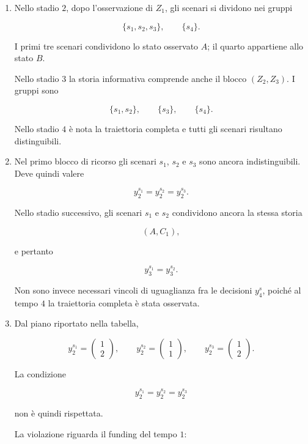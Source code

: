 \begin{enumerate}

\item Nello stadio $2$,
dopo l'osservazione di $Z_1$,
gli scenari si dividono nei gruppi

\[
\{s_1,s_2,s_3\},
\qquad
\{s_4\}.
\]

I primi tre scenari condividono
lo stato osservato $A$;
il quarto appartiene allo stato $B$.

Nello stadio $3$ la storia informativa
comprende anche il blocco $(Z_2,Z_3)$.
I gruppi sono

\[
\{s_1,s_2\},
\qquad
\{s_3\},
\qquad
\{s_4\}.
\]

Nello stadio $4$ \`e nota
la traiettoria completa e tutti
gli scenari risultano distinguibili.

\item Nel primo blocco di ricorso
gli scenari $s_1$, $s_2$ e $s_3$
sono ancora indistinguibili.
Deve quindi valere

\[
\boxed{
y_2^{s_1}
=
y_2^{s_2}
=
y_2^{s_3}.
}
\]

Nello stadio successivo,
gli scenari $s_1$ e $s_2$
condividono ancora la stessa storia

\[
(A,C_1),
\]

e pertanto

\[
\boxed{
y_3^{s_1}=y_3^{s_2}.
}
\]

Non sono invece necessari
vincoli di uguaglianza fra
le decisioni $y_4^s$,
poich\'{e} al tempo $4$
la traiettoria completa
\`e stata osservata.

\item Dal piano riportato nella tabella,

\[
y_2^{s_1}
=
\begin{pmatrix}
1\\
2
\end{pmatrix},
\qquad
y_2^{s_2}
=
\begin{pmatrix}
1\\
1
\end{pmatrix},
\qquad
y_2^{s_3}
=
\begin{pmatrix}
1\\
2
\end{pmatrix}.
\]

La condizione

\[
y_2^{s_1}
=
y_2^{s_2}
=
y_2^{s_3}
\]

non \`e quindi rispettata.

La violazione riguarda il funding
del tempo $1$:


\end{enumerate}
